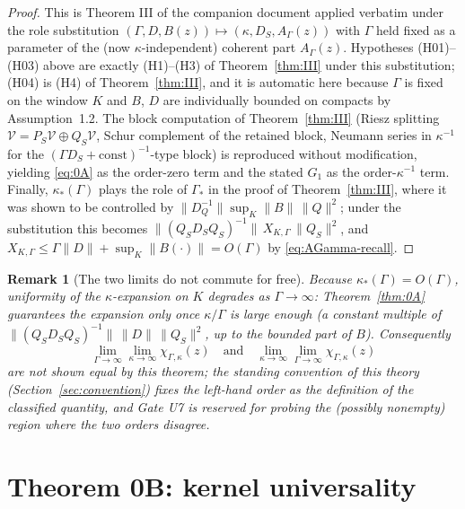 \documentclass[11pt]{article}
\newtheorem{remark}[theorem]{Remark}
\begin{document}
\begin{proof}
This is Theorem III of the companion document applied verbatim under the
role substitution $(\Gamma,D,B(z))\mapsto(\kappa,D_S,A_\Gamma(z))$ with
$\Gamma$ held fixed as a parameter of the (now $\kappa$-independent)
coherent part $A_\Gamma(z)$. Hypotheses (H01)--(H03) above are exactly
(H1)--(H3) of Theorem~\ref{thm:III} under this substitution; (H04) is
(H4) of Theorem~\ref{thm:III}, and it is automatic here because $\Gamma$
is fixed on the window $K$ and $B$, $D$ are individually bounded on
compacts by Assumption~1.2. The block computation of
Theorem~\ref{thm:III} (Riesz splitting $\mathcal V=P_S\mathcal V\oplus
Q_S\mathcal V$, Schur complement of the retained block, Neumann series in
$\kappa^{-1}$ for the $(\Gamma D_S+\text{const})^{-1}$-type block) is
reproduced without modification, yielding \eqref{eq:0A} as the order-zero
term and the stated $G_1$ as the order-$\kappa^{-1}$ term. Finally,
$\kappa_*(\Gamma)$ plays the role of $\Gamma_*$ in the proof of
Theorem~\ref{thm:III}, where it was shown to be controlled by
$\|D_Q^{-1}\|\sup_K\|B\|\,\|Q\|^2$; under the substitution this becomes
$\|(Q_SD_SQ_S)^{-1}\|\,X_{K,\Gamma}\,\|Q_S\|^2$, and $X_{K,\Gamma}\le
\Gamma\|D\|+\sup_K\|B(\cdot)\|=O(\Gamma)$ by \eqref{eq:AGamma-recall}.
\end{proof}

\begin{remark}[The two limits do not commute for free]
\label{rem:double-limit}
Because $\kappa_*(\Gamma)=O(\Gamma)$, uniformity of the $\kappa$-expansion
on $K$ degrades as $\Gamma\to\infty$: Theorem~\ref{thm:0A} guarantees the
expansion only once $\kappa/\Gamma$ is large enough (a constant multiple
of $\|(Q_SD_SQ_S)^{-1}\|\,\|D\|\,\|Q_S\|^2$, up to the bounded part of
$B$). Consequently
\[
\lim_{\Gamma\to\infty}\lim_{\kappa\to\infty}\chi_{\Gamma,\kappa}(z)
\quad\text{and}\quad
\lim_{\kappa\to\infty}\lim_{\Gamma\to\infty}\chi_{\Gamma,\kappa}(z)
\]
are not shown equal by this theorem; the standing convention of this
theory (Section~\ref{sec:convention}) fixes the left-hand order as the
definition of the classified quantity, and Gate U7 is reserved for probing
the (possibly nonempty) region where the two orders disagree.
\end{remark}

\section{Theorem 0B: kernel universality}
\end{document}
